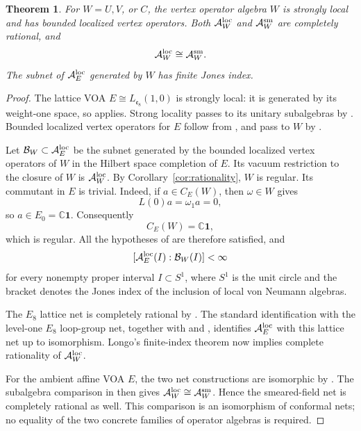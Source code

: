 \documentclass[11pt,reqno]{amsart}
\newtheorem{theorem}{Theorem}[section]
\theoremstyle{definition}\newtheorem{definition}[theorem]{Definition}
\theoremstyle{remark}\newtheorem{remark}[theorem]{Remark}
\newcommand{\C}{\mathbb C}\newcommand{\Z}{\mathbb Z}\newcommand{\Q}{\mathbb Q}
\newcommand{\one}{\mathbf1}\newcommand{\slc}{\mathfrak{sl}_2}
\numberwithin{equation}{section}
\begin{document}
\begin{theorem}\label{thm:nets}
For $W=U,V$, or $C$, the vertex operator algebra $W$ is strongly local and has bounded localized vertex operators. Both $\mathcal A_W^{\rm loc}$ and $\mathcal A_W^{\rm sm}$ are completely rational, and
\[
 \mathcal A_W^{\rm loc}\cong\mathcal A_W^{\rm sm}.
\]
The subnet of $\mathcal A_E^{\rm loc}$ generated by $W$ has finite Jones index.
\end{theorem}
\begin{proof}
The lattice VOA $E\cong L_{\mathfrak e_8}(1,0)$ is strongly local: it is generated by its weight-one space, so \cite[Theorem 8.3]{CKLW} applies. Strong locality passes to its unitary subalgebras by \cite[Theorem 7.1]{CKLW}. Bounded localized vertex operators for $E$ follow from \cite[Theorem 7.4]{TenerFields}, and pass to $W$ by \cite[Proposition 4.16]{TenerFields}.

Let $\mathcal B_W\subset\mathcal A_E^{\rm loc}$ be the subnet generated by the bounded localized vertex operators of $W$ in the Hilbert space completion of $E$. Its vacuum restriction to the closure of $W$ is $\mathcal A_W^{\rm loc}$. By Corollary~\ref{cor:rationality}, $W$ is regular. Its commutant in $E$ is trivial. Indeed, if $a\in C_E(W)$, then $\omega\in W$ gives
\[
 L(0)a=\omega_1a=0,
\]
so $a\in E_0=\C\one$. Consequently
\[
 C_E(W)=\C\one,
\]
which is regular. All the hypotheses of \cite[Corollary 4.24]{TenerFusion} are therefore satisfied, and
\begin{equation}\label{eq:netindex}
 [\mathcal A_E^{\rm loc}(I):\mathcal B_W(I)]<\infty
\end{equation}
for every nonempty proper interval $I\subset S^1$, where $S^1$ is the unit circle and the bracket denotes the Jones index of the inclusion of local von Neumann algebras.

The $E_8$ lattice net is completely rational by \cite[Corollary 3.19]{DXNets}. The standard identification with the level-one $E_8$ loop-group net, together with \cite[Example 8.7]{CKLW} and \cite[Corollary 7.7]{TenerFields}, identifies $\mathcal A_E^{\rm loc}$ with this lattice net up to isomorphism. Longo's finite-index theorem \cite[Theorem 24]{Longo} now implies complete rationality of $\mathcal A_W^{\rm loc}$.

For the ambient affine VOA $E$, the two net constructions are isomorphic by \cite[Corollary 7.7]{TenerFields}. The subalgebra comparison in \cite[Lemma 7.6]{TenerFields} then gives $\mathcal A_W^{\rm loc}\cong\mathcal A_W^{\rm sm}$. Hence the smeared-field net is completely rational as well. This comparison is an isomorphism of conformal nets; no equality of the two concrete families of operator algebras is required.
\end{proof}
\end{document}
